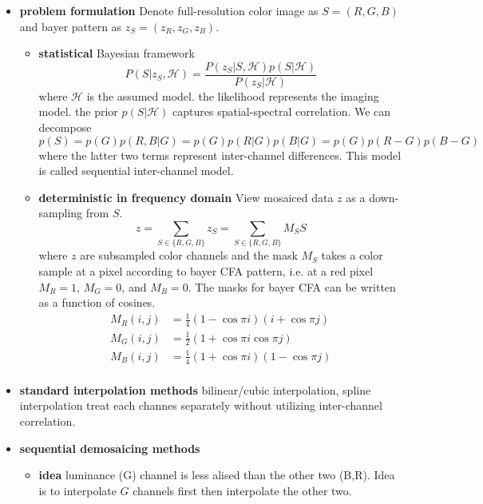 \documentclass[11pt]{article}
\begin{document}
\begin{itemize}
    \item \textbf{problem formulation} Denote full-resolution color image as $S=(R,G,B)$ and bayer pattern as $z_S = (z_R, z_G, z_B)$. 
    \begin{itemize}
        \item \textbf{statistical} Bayesian framework
        \[
            P(S|z_S, \mathcal{H}) = 
            \frac{
                P(z_S | S, \mathcal{H}) p(S|\mathcal{H})
            }{
                P(z_S | \mathcal{H})
            }
        \]
        where $\mathcal{H}$ is the assumed model. the likelihood represents the imaging model. the prior $p(S|\mathcal{H})$ captures spatial-spectral correlation. We can decompose
        \[
            p(S) = p(G) p(R,B | G)
            = p(G) p(R|G) p(B|G)
            = p(G) p(R-G) p(B-G)
        \]
        where the latter two terms represent inter-channel differences. This model is called sequential inter-channel model.
        \item \textbf{deterministic in frequency domain} View mosaiced data $z$ as a down-sampling from $S$.
        \[
            z = \sum_{S\in\{R,G,B\}} z_S = \sum_{S\in \{R,G,B\}} M_S S
        \]
        where $z$ are subsampled color channels and the mask $M_S$ takes a color sample at a pixel according to bayer CFA pattern, i.e. at a red pixel $M_R = 1$, $M_G = 0$, and $M_B = 0$. The masks for bayer CFA can be written as a function of cosines.
        \begin{align*}
            M_R(i,j) &= \frac{1}{4} (1-\cos{\pi i}) (i+\cos{\pi j}) \\
            M_G(i,j) &= \frac{1}{2} (1 + \cos{\pi i} \cos{\pi j}) \\
            M_B(i, j) &= \frac{1}{4} (1 + \cos{\pi i})(1 - \cos{\pi j}) \\ 
        \end{align*}
    \end{itemize}
    \item \textbf{standard interpolation methods} bilinear/cubic interpolation, spline interpolation treat each channes separately without utilizing inter-channel correlation.
    \item \textbf{sequential demosaicing methods} 
    \begin{itemize}
        \item \textbf{idea} luminance (G) channel is less alised than the other two (B,R). Idea is to interpolate $G$ channels first then interpolate the other two.

\end{itemize}
\end{itemize}
\end{document}
